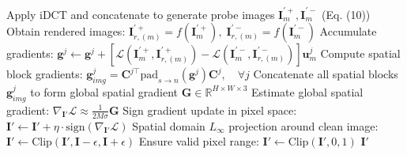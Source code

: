 \begin{algorithm}[h]
\begin{algorithmic}[1]
        \State Apply iDCT and concatenate to generate probe images $\bm{I}_m^{\prime +}, \bm{I}_m^{\prime -}$ (Eq. (10))
        \State Obtain rendered images: $\bm{I}_{r, (m)}^{\prime +} = f(\bm{I}_m^{\prime +}), \; \bm{I}_{r, (m)}^{\prime -} = f(\bm{I}_m^{\prime -})$
        \State Accumulate gradients: $\mathbf{g}^j \leftarrow \mathbf{g}^j + [\mathcal{L}(\bm{I}_m^{\prime +}, \bm{I}_{r, (m)}^{\prime +}) - \mathcal{L}(\bm{I}_m^{\prime -}, \bm{I}_{r, (m)}^{\prime -})] \mathbf{u}_m^j$
    \EndFor
    \vspace{0.05cm}
    \State Compute spatial block gradients: $\mathbf{g}_{img}^j = \bm{C}^{j\top} \text{pad}_{s \to n}(\mathbf{g}^j) \bm{C}^j, \quad \forall j$
    \State Concatenate all spatial blocks $\mathbf{g}_{img}^j$ to form global spatial gradient 
    \Statex \hspace{3em}$\mathbf{G} \in \mathbb{R}^{H \times W \times 3}$
    \State Estimate global spatial gradient: $\nabla_{\bm{I}'} \mathcal{L} \approx \frac{1}{2 M \sigma} \mathbf{G}$
    \State Sign gradient update in pixel space: $\bm{I}' \leftarrow \bm{I}' + \eta \cdot \text{sign}(\nabla_{\bm{I}'} \mathcal{L})$
    \State Spatial domain $L_\infty$ projection around clean image: $\bm{I}' \leftarrow \text{Clip}(\bm{I}', \bm{I} - \epsilon, \bm{I} + \epsilon)$
    \State Ensure valid pixel range: $\bm{I}' \leftarrow \text{Clip}(\bm{I}', 0, 1)$
\EndFor
\State \Return $\bm{I}'$
\end{algorithmic}
\end{algorithm}



